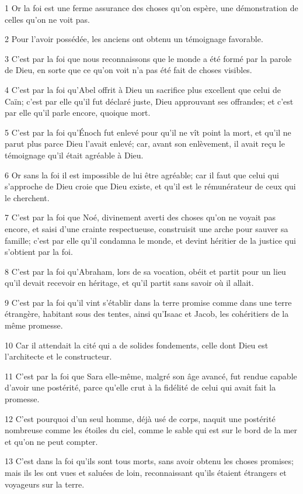 \par 1 Or la foi est une ferme assurance des choses qu'on espère, une démonstration de celles qu'on ne voit pas.
\par 2 Pour l'avoir possédée, les anciens ont obtenu un témoignage favorable.
\par 3 C'est par la foi que nous reconnaissons que le monde a été formé par la parole de Dieu, en sorte que ce qu'on voit n'a pas été fait de choses visibles.
\par 4 C'est par la foi qu'Abel offrit à Dieu un sacrifice plus excellent que celui de Caïn; c'est par elle qu'il fut déclaré juste, Dieu approuvant ses offrandes; et c'est par elle qu'il parle encore, quoique mort.
\par 5 C'est par la foi qu'Énoch fut enlevé pour qu'il ne vît point la mort, et qu'il ne parut plus parce Dieu l'avait enlevé; car, avant son enlèvement, il avait reçu le témoignage qu'il était agréable à Dieu.
\par 6 Or sans la foi il est impossible de lui être agréable; car il faut que celui qui s'approche de Dieu croie que Dieu existe, et qu'il est le rémunérateur de ceux qui le cherchent.
\par 7 C'est par la foi que Noé, divinement averti des choses qu'on ne voyait pas encore, et saisi d'une crainte respectueuse, construisit une arche pour sauver sa famille; c'est par elle qu'il condamna le monde, et devint héritier de la justice qui s'obtient par la foi.
\par 8 C'est par la foi qu'Abraham, lors de sa vocation, obéit et partit pour un lieu qu'il devait recevoir en héritage, et qu'il partit sans savoir où il allait.
\par 9 C'est par la foi qu'il vint s'établir dans la terre promise comme dans une terre étrangère, habitant sous des tentes, ainsi qu'Isaac et Jacob, les cohéritiers de la même promesse.
\par 10 Car il attendait la cité qui a de solides fondements, celle dont Dieu est l'architecte et le constructeur.
\par 11 C'est par la foi que Sara elle-même, malgré son âge avancé, fut rendue capable d'avoir une postérité, parce qu'elle crut à la fidélité de celui qui avait fait la promesse.
\par 12 C'est pourquoi d'un seul homme, déjà usé de corps, naquit une postérité nombreuse comme les étoiles du ciel, comme le sable qui est sur le bord de la mer et qu'on ne peut compter.
\par 13 C'est dans la foi qu'ils sont tous morts, sans avoir obtenu les choses promises; mais ils les ont vues et saluées de loin, reconnaissant qu'ils étaient étrangers et voyageurs sur la terre.

